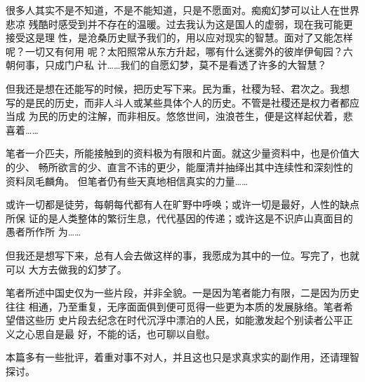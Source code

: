 很多人其实不是不知道，不是不能知道，只是不愿面对。痴痴幻梦可以让人在世界悲凉
残酷时感受到并不存在的温暖。过去我认为这是国人的虚弱，现在我可能更接受这是理
性，是沧桑历史赋予我们的，用以应对现实的智慧。面对了又能怎样呢？一切又有何用
呢？太阳照常从东方升起，哪有什么迷雾外的彼岸伊甸园？六朝何事，只成门户私
计……我们的自愿幻梦，莫不是看透了许多的大智慧？

但我还是想在还能写的时候，把历史写下来。民为重，社稷为轻、君次之。我想
写的是民的历史，而非人斗人或某些具体个人的历史。不管是社稷还是权力者都应当成
为民的历史的注解，而非相反。悠悠世间，浊浪苍生，便是这样起伏着，悲喜着……


笔者一介匹夫，所能接触到的资料极为有限和片面。就这少量资料中，也是价值大的少、
畅所欲言的少、直言不讳的更少，能厘清并抽绎出其中连续性和深刻性的资料凤毛麟角。
但笔者仍有些天真地相信真实的力量……

或许一切都是徒劳，每朝每代都有人在旷野中呼唤；或许一切是最好，人性的缺点所保
证的是人类整体的繁衍生息，代代基因的传递；或许这是不识庐山真面目的愚者所作所
为……

但我还是想写下来，总有人会去做这样的事，我愿成为其中的一位。写完了，也就可以
大方去做我的幻梦了。

笔者所述中国史仅为一些片段，并非全貌。一是因为笔者能力有限，二是因为历史往往
相通，乃至重复，无序面面俱到便可觅得一些更为本质的发展脉络。笔者希望借这些历
史片段去纪念在时代沉浮中漂泊的人民，如能激发起个别读者公平正义之心思自是最
好，不能的话，也可聊以自慰。

本篇多有一些批评，着重对事不对人，并且这也只是求真求实的副作用，还请理智探讨。








